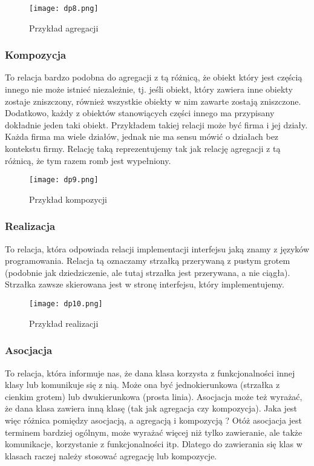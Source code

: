 \documentclass[a4paper,15pt]{article}
\begin{document}
\begin{figure}[H]
\centering
  \texttt{[image: dp8.png]}
  \caption{Przykład agregacji}
\end{figure}


\subsubsection{Kompozycja}
To relacja bardzo podobna do agregacji z tą różnicą, że obiekt który jest częścią innego nie może istnieć niezależnie, tj. jeśli obiekt, który zawiera inne obiekty zostaje zniszczony, również wszystkie obiekty w nim zawarte zostają zniszczone. Dodatkowo, każdy z obiektów stanowiących części innego ma przypisany dokładnie jeden taki obiekt. Przykładem takiej relacji może być firma i jej działy. Każda firma ma wiele działów, jednak nie ma sensu mówić o działach bez kontekstu firmy. Relację taką reprezentujemy tak jak relację agregacji z tą różnicą, że tym razem romb jest wypełniony. 

\begin{figure}[H]
\centering
  \texttt{[image: dp9.png]}
  \caption{Przykład kompozycji}
\end{figure}



\subsubsection{Realizacja}
To relacja, która odpowiada relacji implementacji interfejsu jaką znamy z języków programowania. Relacja tą oznaczamy strzałką przerywaną z pustym grotem (podobnie jak dziedziczenie, ale tutaj strzałka jest przerywana, a nie ciągła). Strzałka zawsze skierowana jest w stronę interfejsu, który implementujemy. 

\begin{figure}[H]
\centering
  \texttt{[image: dp10.png]}
  \caption{Przykład realizacji}
\end{figure}


\subsubsection{Asocjacja}
To relacja, która informuje nas, że dana klasa korzysta z funkcjonalności innej klasy lub komunikuje się z nią. Może ona być jednokierunkowa (strzałka z cienkim grotem) lub dwukierunkowa (prosta linia). Asocjacja może też wyrażać, że dana klasa zawiera inną klasę (tak jak agregacja czy kompozycja). Jaka jest więc różnica pomiędzy asocjacją, a agregacją i kompozycją ? Otóż asocjacja jest terminem bardziej ogólnym, może wyrażać więcej niż tylko zawieranie, ale także komunikacje, korzystanie z funkcjonalności itp. Dlatego do zawierania się klas w klasach raczej należy stosować agregację lub kompozycje.  
\end{document}
